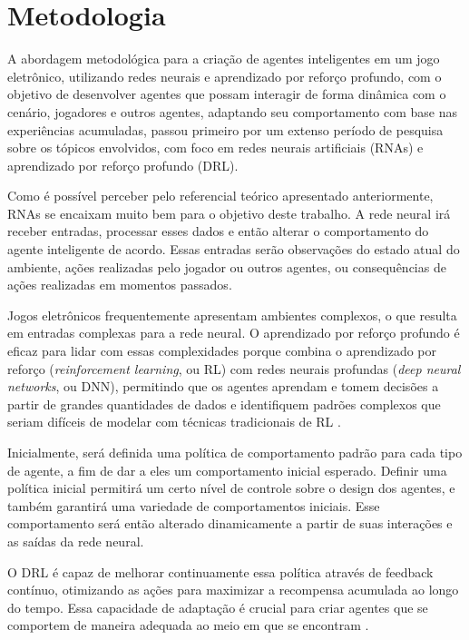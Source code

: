 \chapter[Metodologia]{Metodologia}\label{capitulo4}

A abordagem metodológica para a criação de agentes inteligentes em um jogo eletrônico, utilizando redes neurais e aprendizado por reforço profundo, com o objetivo de desenvolver agentes que possam interagir de forma dinâmica com o cenário, jogadores e outros agentes, adaptando seu comportamento com base nas experiências acumuladas, passou primeiro por um extenso período de pesquisa sobre os tópicos envolvidos, com foco em redes neurais artificiais (RNAs) e aprendizado por reforço profundo (DRL).

Como é possível perceber pelo referencial teórico apresentado anteriormente, RNAs se encaixam muito bem para o objetivo deste trabalho. A rede neural irá receber entradas, processar esses dados e então alterar o comportamento do agente inteligente de acordo. Essas entradas serão observações do estado atual do ambiente, ações realizadas pelo jogador ou outros agentes, ou consequências de ações realizadas em momentos passados.

Jogos eletrônicos frequentemente apresentam ambientes complexos, o que resulta em entradas complexas para a rede neural. O aprendizado por reforço profundo é eficaz para lidar com essas complexidades porque combina o aprendizado por reforço (\textit{reinforcement learning}, ou RL) com redes neurais profundas (\textit{deep neural networks}, ou DNN), permitindo que os agentes aprendam e tomem decisões a partir de grandes quantidades de dados e identifiquem padrões complexos que seriam difíceis de modelar com técnicas tradicionais de RL \cite{mnih2015human}.

Inicialmente, será definida uma política de comportamento padrão para cada tipo de agente, a fim de dar a eles um comportamento inicial esperado. Definir uma política inicial permitirá um certo nível de controle sobre o design dos agentes, e também garantirá uma variedade de comportamentos iniciais. Esse comportamento será então alterado dinamicamente a partir de suas interações e as saídas da rede neural.

O DRL é capaz de melhorar continuamente essa política através de feedback contínuo, otimizando as ações para maximizar a recompensa acumulada ao longo do tempo. Essa capacidade de adaptação é crucial para criar agentes que se comportem de maneira adequada ao meio em que se encontram \cite{sutton2018reinforcement}.

